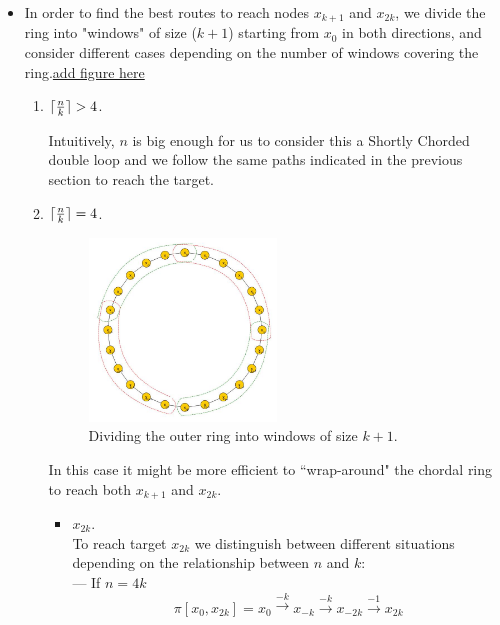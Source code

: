 \begin{itemize}

 


\item In order to find the best routes to reach nodes $x_{k+1}$ and $x_{2k}$, we divide the ring into "windows" of size ($k+1$) starting from $x_0$ in both directions, and consider different cases depending on the number of windows covering the ring.\underline{add figure here}

\begin{enumerate}

\item  $\lceil {n \over k} \rceil >  4$.

 Intuitively,   $n$  is big enough for us to consider this a Shortly Chorded double loop and we follow the same paths indicated in the previous section to reach the target.


\item  $\lceil {n \over k} \rceil=  4$.

\begin{figure}[H]
  \centering  
  \includegraphics[width=0.5\textwidth]{figures/dloop_window.jpg}
  \caption{Dividing the outer ring into windows of size $k+1$.}\label{fig:dloop-window}
\end{figure}

 
 In this case it might be  more efficient to ``wrap-around" the chordal ring to reach  both  $x_{k+1}$ and $x_{2k}$.
      
  \begin{itemize}    
\item $x_{2k}$. \\
To reach target $x_{2k}$ we distinguish between different situations depending on the relationship
 between $n$ and $k$: \\
--- If $n=4k$
 $$ \pi[x_0,x_{2k}]  = x_{0} \xrightarrow {-k} x_{-k} \xrightarrow {-k} x_{-2k} \xrightarrow {-1} x_{2k}$$


\end{itemize}
\end{enumerate}
\end{itemize}
